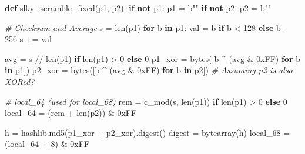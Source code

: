 \documentclass[
]{article}
\newenvironment{Shaded}{}{}
\newcommand{\BaseNTok}[1]{\textcolor[rgb]{0.25,0.63,0.44}{#1}}
\newcommand{\BuiltInTok}[1]{\textcolor[rgb]{0.00,0.50,0.00}{#1}}
\newcommand{\CommentTok}[1]{\textcolor[rgb]{0.38,0.63,0.69}{\textit{#1}}}
\newcommand{\ControlFlowTok}[1]{\textcolor[rgb]{0.00,0.44,0.13}{\textbf{#1}}}
\newcommand{\DecValTok}[1]{\textcolor[rgb]{0.25,0.63,0.44}{#1}}
\newcommand{\KeywordTok}[1]{\textcolor[rgb]{0.00,0.44,0.13}{\textbf{#1}}}
\newcommand{\NormalTok}[1]{#1}
\newcommand{\OperatorTok}[1]{\textcolor[rgb]{0.40,0.40,0.40}{#1}}
\newcommand{\StringTok}[1]{\textcolor[rgb]{0.25,0.44,0.63}{#1}}
\begin{document}
\begin{Shaded}
\begin{Highlighting}[]
\KeywordTok{def}\NormalTok{ slky\_scramble\_fixed(p1, p2):}
    \ControlFlowTok{if} \KeywordTok{not}\NormalTok{ p1: p1 }\OperatorTok{=} \StringTok{b""}
    \ControlFlowTok{if} \KeywordTok{not}\NormalTok{ p2: p2 }\OperatorTok{=} \StringTok{b""}
    
    \CommentTok{\# Checksum and Average}
\NormalTok{    s }\OperatorTok{=} \BuiltInTok{len}\NormalTok{(p1)}
    \ControlFlowTok{for}\NormalTok{ b }\KeywordTok{in}\NormalTok{ p1:}
\NormalTok{        val }\OperatorTok{=}\NormalTok{ b }\ControlFlowTok{if}\NormalTok{ b }\OperatorTok{\textless{}} \DecValTok{128} \ControlFlowTok{else}\NormalTok{ b }\OperatorTok{{-}} \DecValTok{256}
\NormalTok{        s }\OperatorTok{+=}\NormalTok{ val}
    
\NormalTok{    avg }\OperatorTok{=}\NormalTok{ s }\OperatorTok{//} \BuiltInTok{len}\NormalTok{(p1) }\ControlFlowTok{if} \BuiltInTok{len}\NormalTok{(p1) }\OperatorTok{\textgreater{}} \DecValTok{0} \ControlFlowTok{else} \DecValTok{0}
\NormalTok{    p1\_xor }\OperatorTok{=} \BuiltInTok{bytes}\NormalTok{([b }\OperatorTok{\^{}}\NormalTok{ (avg }\OperatorTok{\&} \BaseNTok{0xFF}\NormalTok{) }\ControlFlowTok{for}\NormalTok{ b }\KeywordTok{in}\NormalTok{ p1])}
\NormalTok{    p2\_xor }\OperatorTok{=} \BuiltInTok{bytes}\NormalTok{([b }\OperatorTok{\^{}}\NormalTok{ (avg }\OperatorTok{\&} \BaseNTok{0xFF}\NormalTok{) }\ControlFlowTok{for}\NormalTok{ b }\KeywordTok{in}\NormalTok{ p2]) }\CommentTok{\# Assuming p2 is also XORed?}
    
    \CommentTok{\# local\_64 (used for local\_68)}
\NormalTok{    rem }\OperatorTok{=}\NormalTok{ c\_mod(s, }\BuiltInTok{len}\NormalTok{(p1)) }\ControlFlowTok{if} \BuiltInTok{len}\NormalTok{(p1) }\OperatorTok{\textgreater{}} \DecValTok{0} \ControlFlowTok{else} \DecValTok{0}
\NormalTok{    local\_64 }\OperatorTok{=}\NormalTok{ (rem }\OperatorTok{+} \BuiltInTok{len}\NormalTok{(p2)) }\OperatorTok{\&} \BaseNTok{0xFF}
    
\NormalTok{    h }\OperatorTok{=}\NormalTok{ hashlib.md5(p1\_xor }\OperatorTok{+}\NormalTok{ p2\_xor).digest()}
\NormalTok{    digest }\OperatorTok{=} \BuiltInTok{bytearray}\NormalTok{(h)}
\NormalTok{    local\_68 }\OperatorTok{=}\NormalTok{ (local\_64 }\OperatorTok{+} \DecValTok{8}\NormalTok{) }\OperatorTok{\&} \BaseNTok{0xFF}
    

\end{Highlighting}
\end{Shaded}
\end{document}
